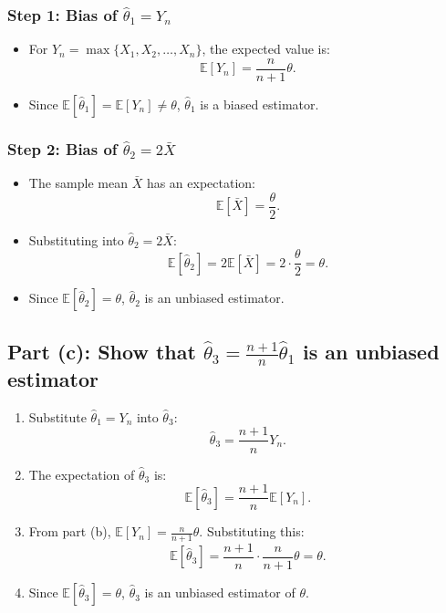 \documentclass{article}
\begin{document}
\subsubsection*{Step 1: Bias of $\hat{\theta}_1 = Y_n$}

\begin{itemize}
    \item For $Y_n = \max\{X_1, X_2, \dots, X_n\}$, the expected value is:
    \[
    \mathbb{E}[Y_n] = \frac{n}{n+1} \theta.
    \]

    \item Since $\mathbb{E}[\hat{\theta}_1] = \mathbb{E}[Y_n] \neq \theta$, $\hat{\theta}_1$ is a biased estimator.
\end{itemize}

\subsubsection*{Step 2: Bias of $\hat{\theta}_2 = 2\bar{X}$}

\begin{itemize}
    \item The sample mean $\bar{X}$ has an expectation:
    \[
    \mathbb{E}[\bar{X}] = \frac{\theta}{2}.
    \]

    \item Substituting into $\hat{\theta}_2 = 2\bar{X}$:
    \[
    \mathbb{E}[\hat{\theta}_2] = 2 \mathbb{E}[\bar{X}] = 2 \cdot \frac{\theta}{2} = \theta.
    \]

    \item Since $\mathbb{E}[\hat{\theta}_2] = \theta$, $\hat{\theta}_2$ is an unbiased estimator.
\end{itemize}

\subsection*{Part (c): Show that $\hat{\theta}_3 = \frac{n+1}{n} \hat{\theta}_1$ is an unbiased estimator}

\begin{enumerate}
    \item Substitute $\hat{\theta}_1 = Y_n$ into $\hat{\theta}_3$:
    \[
    \hat{\theta}_3 = \frac{n+1}{n} Y_n.
    \]

    \item The expectation of $\hat{\theta}_3$ is:
    \[
    \mathbb{E}[\hat{\theta}_3] = \frac{n+1}{n} \mathbb{E}[Y_n].
    \]

    \item From part (b), $\mathbb{E}[Y_n] = \frac{n}{n+1} \theta$. Substituting this:
    \[
    \mathbb{E}[\hat{\theta}_3] = \frac{n+1}{n} \cdot \frac{n}{n+1} \theta = \theta.
    \]

    \item Since $\mathbb{E}[\hat{\theta}_3] = \theta$, $\hat{\theta}_3$ is an unbiased estimator of $\theta$.
\end{enumerate}
\end{document}
